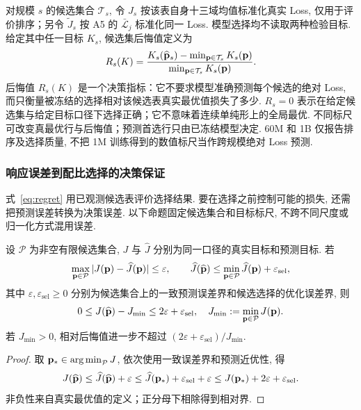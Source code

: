 对规模 $s$ 的候选集合 $\mathcal T_s$, 令 $J_s$ 按该表自身十三域均值标准化真实 Loss, 仅用于评价排序；另令 $\widetilde J_s$ 按 A5 的 $\bar{\mathcal L}_j$ 标准化同一 Loss. 模型选择均不读取两种检验目标. 给定其中任一目标 $K_s$, 候选集后悔值定义为
\begin{equation}\label{eq:regret}
R_s(K)=
\frac{K_s(\widehat{\mathbf p}_s)-\min_{\mathbf p\in\mathcal T_s}K_s(\mathbf p)}
{\min_{\mathbf p\in\mathcal T_s}K_s(\mathbf p)}.
\end{equation}
后悔值 $R_s(K)$ 是一个决策指标：它不要求模型准确预测每个候选的绝对 Loss, 而只衡量被冻结的选择相对该候选表真实最优值损失了多少. $R_s=0$ 表示在给定候选集与给定目标口径下选择正确；它不意味着连续单纯形上的全局最优. 不同标尺可改变真最优行与后悔值；预测首选行只由已冻结模型决定. 60M 和 1B 仅报告排序及选择质量, 不把 1M 训练得到的数值标尺当作跨规模绝对 Loss 预测. 
\subsubsection{响应误差到配比选择的决策保证}

式~\eqref{eq:regret} 用已观测候选表评价选择结果. 要在选择之前控制可能的损失, 还需把预测误差转换为决策误差. 以下命题固定候选集合和目标标尺, 不跨不同尺度或归一化方式混用误差. 

\begin{proposition}[配比选择的误差与后悔界]\label{prop:q1-decision-regret-v37}
设 $\mathcal P$ 为非空有限候选集合, $J$ 与 $\widehat J$ 分别为同一口径的真实目标和预测目标. 若
\[
\max_{\mathbf p\in\mathcal P}|J(\mathbf p)-\widehat J(\mathbf p)|\le\varepsilon, 
\qquad
\widehat J(\widehat{\mathbf p})\le\min_{\mathbf p\in\mathcal P}\widehat J(\mathbf p)+\varepsilon_{\mathrm{sel}}, 
\]
其中 $\varepsilon, \varepsilon_{\mathrm{sel}}\ge0$ 分别为候选集合上的一致预测误差界和候选选择的优化误差界, 则
\begin{equation}\label{eq:q1-decision-regret-v37}
0\le J(\widehat{\mathbf p})-J_{\min}\le2\varepsilon+\varepsilon_{\mathrm{sel}}, 
\quad J_{\min}:=\min_{\mathbf p\in\mathcal P}J(\mathbf p).
\end{equation}
若 $J_{\min}>0$, 相对后悔值进一步不超过 $(2\varepsilon+\varepsilon_{\mathrm{sel}})/J_{\min}$. 
\end{proposition}
\begin{proof}
取 $\mathbf p_*\in\operatorname*{arg\,min}_{\mathcal P}J$, 依次使用一致误差界和预测近优性, 得
\[
J(\widehat{\mathbf p})\le\widehat J(\widehat{\mathbf p})+\varepsilon
\le\widehat J(\mathbf p_*)+\varepsilon_{\mathrm{sel}}+\varepsilon
\le J(\mathbf p_*)+2\varepsilon+\varepsilon_{\mathrm{sel}}.
\]
非负性来自真实最优值的定义；正分母下相除得到相对界. 
\end{proof}

